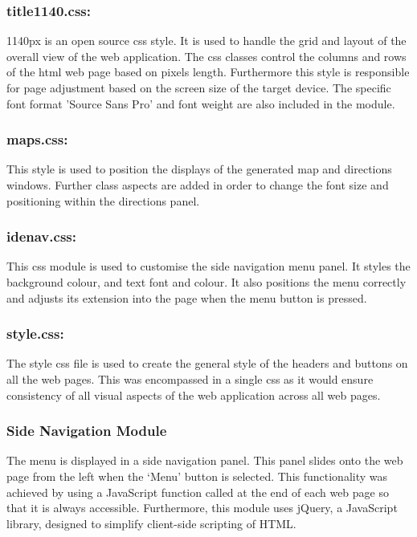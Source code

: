 \documentclass[10pt,twocolumn]{witseiepaper}
\begin{document}
		\subsubsection*{title1140.css:}  1140px is an open source css style. It is used to handle the grid and layout of the overall view of the web application. The css classes control the columns and rows of the html web page based on pixels length. Furthermore this style is responsible for page adjustment based on the screen size of the target device. The specific font format 'Source Sans Pro' and font weight are also included in the module.
		
		\subsubsection*{maps.css:} This style is used to position the displays of the generated map and directions windows. Further class aspects are added in order to change the font size and positioning within the directions panel.
		
		\subsubsection*{idenav.css:} This css module is used to customise the side navigation menu panel. It styles the background colour, and text font and colour. It also positions the menu correctly and adjusts its extension into the page when the menu button is pressed.
		
		\subsubsection*{style.css:} The style css file is used to create the general style of the headers and buttons on all the web pages. This was encompassed in a single css as it would ensure consistency of all visual aspects of the web application across all web pages.  
		
		\subsubsection{Side Navigation Module}
		
		The menu is displayed in a side navigation panel. This panel slides onto the web page from the left when the `Menu' button is selected. This functionality was achieved by using a JavaScript function called at the end of each web page so that it is always accessible. Furthermore, this module uses jQuery, a JavaScript library, designed to simplify client-side scripting of HTML.	
		
\end{document}
